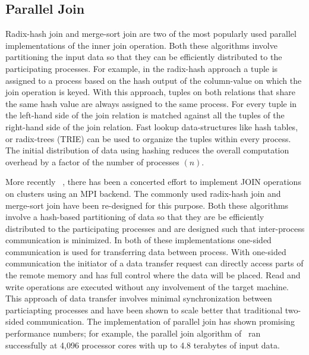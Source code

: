 \subsection{Parallel Join}
%
Radix-hash join and merge-sort join are two of the most popularly used parallel implementations of the inner join operation.
Both these algorithms involve partitioning the input data so that they can be efficiently distributed 
to the participating processes. For example, in the radix-hash approach a tuple is assigned to a process 
based on the hash output of the column-value on which the join operation is keyed.
With this approach, tuples on both relations that share the same hash value
are always assigned to the same process. For every tuple in the left-hand side of the join relation is matched against all the tuples of the right-hand side of the join relation. Fast lookup data-structures like hash tables, or radix-trees (TRIE) can be used to organize the tuples within every process. The initial distribution of data using hashing reduces the overall computation overhead by a factor of the number of processes $(n)$. 

More recently ~\cite{Barthels:2017:DJA:3055540.3055545, Barthels:2015:RIJ:2723372.2750547}, there has been a concerted effort to implement JOIN operations on clusters using an MPI backend. The commonly used radix-hash join and merge-sort join have been re-designed for this purpose. 
Both these algorithms involve a hash-based partitioning of data so that they are be efficiently distributed 
to the participating processes and are designed such that inter-process communication is minimized. In both of these implementations
one-sided communication is used for transferring data between process. With one-sided communication the initiator of a data transfer request can directly access
parts of the remote memory and has full control where the data will be placed. Read and write operations are executed
without any involvement of the target machine. This approach of data transfer involves minimal synchronization between particiapting processes and have been shown to scale better that traditional two-sided communication. The implementation of parallel join has shown promising performance numbers; for example, the parallel join algorithm of~\cite{Barthels:2017:DJA:3055540.3055545}
ran successfully at 4,096 processor cores with up to 4.8 terabytes of input data.



